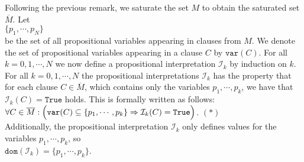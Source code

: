 Following the previous remark, we saturate the set $M$ to obtain the saturated set $\overline{M}$. Let
\\[0.2cm]
\hspace*{1.3cm}
$\{ p_1, \cdots, p_N \}$
\\[0.2cm]
be the set of all propositional variables appearing in clauses from $M$. We denote the set of propositional variables appearing in a clause $C$ by $\mathtt{var}(C)$.
For all $k=0,1,\cdots,N$
we now define a propositional interpretation $\mathcal{I}_k$ by induction on $k$.  For all $k=0,1,\cdots,N$ the
propositional interpretations $\mathcal{I}_k$ has the property that for each clause $C \in \overline{M}$,
which contains only the variables $p_1,\cdots,p_k$, we have that
$\mathcal{I}_k(C) = \mathtt{True}$ holds. This is formally written as follows:
\\[0.2cm]
\hspace*{1.3cm}
$\forall C \in \overline{M}:\Bigl(\mathtt{var}(C) \subseteq \{p_1, \cdots, p_k\} \Rightarrow \mathcal{I}_k(C) =
\mathtt{True}\Bigl)$. \hspace*{\fill} $(*)$
\\[0.2cm]
Additionally, the propositional interpretation $\mathcal{I}_k$ only defines values for the variables
$p_1,\cdots,p_k$, so
\\[0.2cm]
\hspace*{1.3cm}
$\mathtt{dom}(\mathcal{I}_k) = \{p_1, \cdots, p_k\}$.
